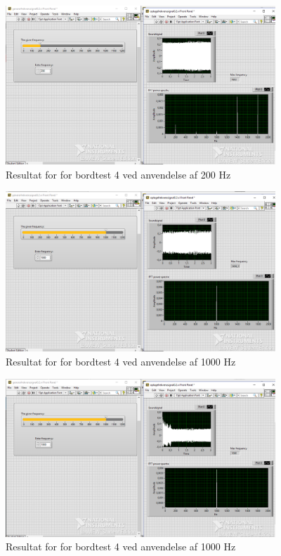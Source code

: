 {			\begin{figure}[htb]
			\centering
				\includegraphics[width=4in]{Bordtest4200Hz}
				\caption{Resultat for for bordtest 4 ved anvendelse af 200 Hz}	
				\label{fig:bt4200}
			\end{figure} 
			
			\begin{figure}[htb]
			\centering
				\includegraphics[width=4in]{Bordtest41000Hz}
				\caption{Resultat for for bordtest 4 ved anvendelse af 1000 Hz}	
				\label{fig:bt41000}
			\end{figure} 
			
			\begin{figure}[htb]
			\centering
				\includegraphics[width=4in]{Bordtest41000Hzb}
				\caption{Resultat for for bordtest 4 ved anvendelse af 1000 Hz}	
				\label{fig:bt41000b}
			\end{figure} 
			
}
